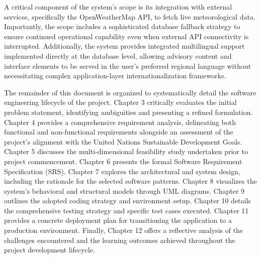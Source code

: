 A critical component of the system's scope is its integration with external services, specifically the OpenWeatherMap API, to fetch live meteorological data. Importantly, the scope includes a sophisticated database fallback strategy to ensure continued operational capability even when external API connectivity is interrupted. Additionally, the system provides integrated multilingual support implemented directly at the database level, allowing advisory content and interface elements to be served in the user's preferred regional language without necessitating complex application-layer internationalization frameworks.

The remainder of this document is organized to systematically detail the software engineering lifecycle of the project. Chapter 3 critically evaluates the initial problem statement, identifying ambiguities and presenting a refined formulation. Chapter 4 provides a comprehensive requirement analysis, delineating both functional and non-functional requirements alongside an assessment of the project's alignment with the United Nations Sustainable Development Goals. Chapter 5 discusses the multi-dimensional feasibility study undertaken prior to project commencement. Chapter 6 presents the formal Software Requirement Specification (SRS). Chapter 7 explores the architectural and system design, including the rationale for the selected software patterns. Chapter 8 visualizes the system's behavioral and structural models through UML diagrams. Chapter 9 outlines the adopted coding strategy and environment setup. Chapter 10 details the comprehensive testing strategy and specific test cases executed. Chapter 11 provides a concrete deployment plan for transitioning the application to a production environment. Finally, Chapter 12 offers a reflective analysis of the challenges encountered and the learning outcomes achieved throughout the project development lifecycle.
